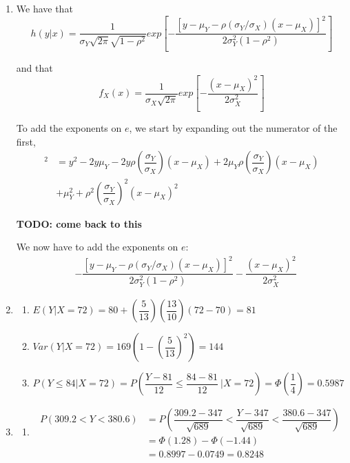 \documentclass{article}
\newcommand\todo[1]{\textbf{TODO: #1}}%
\newcommand\mfrac[2]{\left(\dfrac{#1}{#2}\right)}
\begin{document}
\begin{enumerate}
     
     \item
      We have that 
      $$h(y|x) = \dfrac{1}{\sigma_Y\sqrt{2\pi}\sqrt{1-\rho^2}}exp\left[-\dfrac{[y-\mu_Y - \rho(\sigma_Y/\sigma_X)(x-\mu_X)]^2}{2\sigma_Y^2(1-\rho^2)}\right]$$
      
      and that
      $$f_X(x) = \dfrac{1}{\sigma_X\sqrt{2\pi}}exp\left[-\dfrac{(x-\mu_X)^2}{2\sigma_X^2}\right]$$
      
      To add the exponents on $e$, we start by expanding out the numerator of the first,
      \begin{align*}
	[y-\mu_Y - \rho(\sigma_Y/\sigma_X)(x-\mu_X)]^2 &= 
	y^2 - 2y\mu_Y - 2y\rho\mfrac{\sigma_Y}{\sigma_X}(x-\mu_X) + 2\mu_Y\rho\mfrac{\sigma_Y}{\sigma_X}(x-\mu_X) \\
	&+ \mu_Y^2 + \rho^2\mfrac{\sigma_Y}{\sigma_X}^2(x-\mu_X)^2
      \end{align*}
      
      \todo{come back to this}
      
      We now have to add the exponents on $e$:
      \begin{align*}
       &-\dfrac{[y-\mu_Y - \rho(\sigma_Y/\sigma_X)(x-\mu_X)]^2}{2\sigma_Y^2(1-\rho^2)} - \dfrac{(x-\mu_X)^2}{2\sigma_X^2} 
      \end{align*}

     \addtocounter{enumi}{1}
     
     \item
      \begin{enumerate}
       \item
	$E(Y|X=72) = 80 + \mfrac{5}{13}\mfrac{13}{10}(72-70) = 81$
       
       \item
	$Var(Y|X=72) = 169\left(1-\mfrac{5}{13}^2\right) = 144$
       
       \item
	$P(Y \le 84|X=72) = P\left(\dfrac{Y-81}{12} \le \dfrac{84-81}{12}\ \Big|X=72\right)
	  = \Phi\mfrac{1}{4} = 0.5987$
      \end{enumerate}
     \addtocounter{enumi}{2}
     
     \item
      \begin{enumerate}
       \item
	\begin{align*}
	 P(309.2 < Y <380.6) &= P\left(\dfrac{309.2 - 347}{\sqrt{689}} < \dfrac{Y-347}{\sqrt{689}} < \dfrac{380.6 - 347}{\sqrt{689}}\right) \\
	  &= \Phi(1.28) - \Phi(-1.44) \\
	  &= 0.8997 - 0.0749 = 0.8248
	\end{align*}
       

\end{enumerate}
\end{enumerate}
\end{document}
